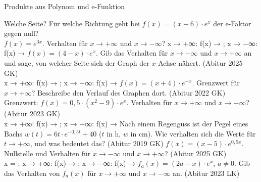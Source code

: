 \setcounter{aufgabe}{12}

\begin{aufgabe}{Produkte aus Polynom und e-Funktion}
\begin{teile}
\teil Welche Seite? Für welche Richtung geht bei $f(x) = (x - 6) \cdot e^{x}$ der e-Faktor gegen null?  \\ 
\teil $f(x) = e^{3x}$. Verhalten für $x \to +\infty$ und $x \to -\infty$? x → +∞: f(x) → \leerfeld ; x → −∞: f(x) → \leerfeld
\teil $f(x) = (4 - x) \cdot e^{x}$. Gib das Verhalten für $x \to -\infty$ und $x \to +\infty$ an und sage, von welcher Seite sich der Graph der $x$-Achse nähert. \hfill (Abitur 2025 GK) \\ x → +∞: f(x) → \leerfeld ; x → −∞: f(x) → \leerfeld
\teil $f(x) = (x + 4) \cdot e^{-x}$. Grenzwert für $x \to +\infty$? Beschreibe den Verlauf des Graphen dort. \hfill (Abitur 2022 GK) \\ Grenzwert: \leerfeld
\teil $f(x) = 0{,}5 \cdot (x^2 - 9) \cdot e^{x}$. Verhalten für $x \to +\infty$ und $x \to -\infty$? \hfill (Abitur 2023 GK) \\ x → +∞: f(x) → \leerfeld ; x → −∞: f(x) → \leerfeld
\teil Nach einem Regenguss ist der Pegel eines Bachs $w(t) = 6t \cdot e^{-0{,}5t} + 40$ ($t$ in h, $w$ in cm). Wie verhalten sich die Werte für $t \to +\infty$, und was bedeutet das? \hfill (Abitur 2019 GK)
\teil $f(x) = (x - 5) \cdot e^{0{,}5x}$. Nullstelle und Verhalten für $x \to -\infty$ und $x \to +\infty$? \hfill (Abitur 2025 GK) \\ x = \leerfeld ; x → +∞: f(x) → \leerfeld ; x → −∞: f(x) → \leerfeld
\teil $f_a(x) = (2a - x) \cdot e^{x}$, $a \ne 0$. Gib das Verhalten von $f_a(x)$ für $x \to +\infty$ und $x \to -\infty$ an. \hfill (Abitur 2023 LK)
\end{teile}
\end{aufgabe}

